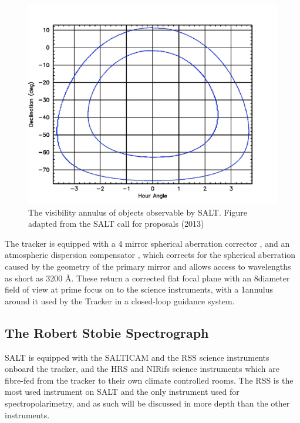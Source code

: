 \begin{figure}[t]
    \centering
    \includegraphics[width = 13cm]{figures/2_SALT_visibility.png}
    \caption{The visibility annulus of objects observable by SALT. Figure adapted from the SALT call for proposals (2013)\protect\footnotemark}
    \label{fig:SALT_visibility}
\end{figure}


The tracker is equipped with a 4 mirror spherical aberration corrector \citep{SALT_SAC}, and an atmospheric dispersion compensator \citep{SALT_ADC}, which corrects for the spherical aberration caused by the geometry of the primary mirror and allows access to wavelengths as short as 3200 \AA. These return a corrected flat focal plane with an 8\arcmin diameter field of view at prime focus on to the science instruments, with a 1\arcmin annulus around it used by the Tracker in a closed-loop guidance system.
\prgph

\subsection{The Robert Stobie Spectrograph}

SALT is equipped with the \gls{SALTICAM} and the \gls{RSS} science instruments onboard the tracker, and the \gls{HRS} and \gls{NIRifs} science instruments which are fibre-fed from the tracker to their own climate controlled rooms. The \gls{RSS} is the most used instrument on \gls{SALT} and the only instrument used for spectropolarimetry, and as such will be discussed in more depth than the other instruments.


